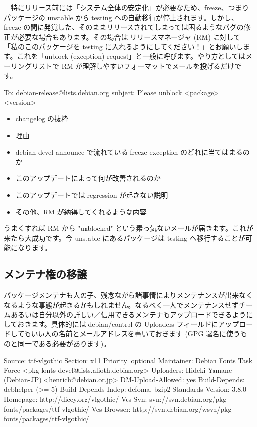 \documentclass[mingoth,a4paper]{jsarticle}
\begin{document}
　特にリリース前には「システム全体の安定化」が必要なため、freeze、つまりパッケージの unstable から testing への自動移行が停止されます。しかし、freeze の間に発覚した、そのままリリースされてしまっては困るようなバグの修正が必要な場合もあります。その場合は リリースマネージャ (RM) に対して「私のこのパッケージを testing に入れるようにしてください！」とお願いします。これを「unblock (exception) request」と一般に呼びます。やり方としてはメーリングリストで RM が理解しやすいフォーマットでメールを投げるだけです。

\begin{commandline}
To: debian-release@lists.debian.org
subject: Please unblock <package> <version>
\end{commandline}

\begin{itemize}
 \item changelog の抜粋
 \item 理由
 \item debian-devel-announce で流れている freeze exception のどれに当てはまるのか
 \item このアップデートによって何が改善されるのか
 \item このアップデートでは regression が起きない説明
 \item その他、RM が納得してくれるような内容
\end{itemize}

うまくすれば RM から "unblocked" という素っ気ないメールが届きます。これが来たら大成功です。今 unstable にあるパッケージは testing へ移行することが可能になります。


\subsection{メンテナ権の移譲}

パッケージメンテナも人の子、残念ながら諸事情によりメンテナンスが出来なくなるような事態が起きるかもしれません。なるべく一人でメンテナンスせずチームあるいは自分以外の詳しい／信用できるメンテナもアップロードできるようにしておきます。具体的には debian/control の Uploaders フィールドにアップロードしてもいい人の名前とメールアドレスを書いておきます (GPG 署名に使うものと同一である必要があります)。

\begin{commandline}
Source: ttf-vlgothic
Section: x11
Priority: optional
Maintainer: Debian Fonts Task Force <pkg-fonts-devel@lists.alioth.debian.org>
Uploaders: Hideki Yamane (Debian-JP) <henrich@debian.or.jp>
DM-Upload-Allowed: yes
Build-Depends: debhelper (>= 5)
Build-Depends-Indep: defoma, bzip2
Standards-Version: 3.8.0
Homepage: http://dicey.org/vlgothic/
Vcs-Svn: svn://svn.debian.org/pkg-fonts/packages/ttf-vlgothic/
Vcs-Browser: http://svn.debian.org/wsvn/pkg-fonts/packages/ttf-vlgothic/
\end{commandline}
\end{document}
